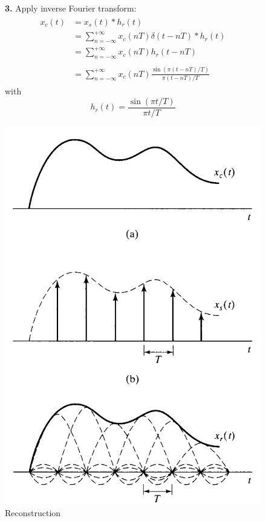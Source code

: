 \begin{figure}[H]
\begin{minipage}{0.65\textwidth}
\textbf{3.} Apply inverse Fourier transform:
\begin{align*} \begin{split}
 x_{c}(t)&= x_{s}(t) * h_{r}(t) \\
 &=\sum_{n=-\infty}^{+\infty} x_{c}(nT) \delta(t-nT) * h_{r}(t)\\
 &=\boxed{\sum_{n=-\infty}^{+\infty} x_{c}(nT) h_{r}(t-nT)}\\\\
 &=\sum_{n=-\infty}^{+\infty} x_{c}(nT) \frac{\sin(\pi(t-nT) / T)}{\pi(t-nT) / T}
\end{split}\end{align*}
with \[ h_{r}(t)=\frac{\sin(\pi t/T)}{\pi t/T} \]
\end{minipage} \hfill
\begin{minipage}{0.35\textwidth}
\includegraphics[width = \textwidth]{images/reconstruction2}
\caption{Reconstruction}
\end{minipage}
\end{figure}